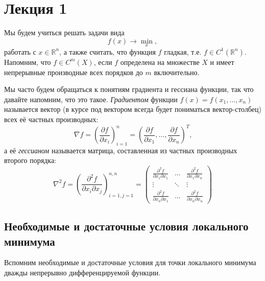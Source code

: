 \documentclass[a4paper, 12pt]{article}
\begin{document}

\section{Лекция 1}

Мы будем учиться решать задачи вида $$f(x) \rightarrow \min_{x},$$ работать с $x \in \mathbb{R}^n$, а также считать, что функция $f$ гладкая, т.е. $f \in C^1(\mathbb{R}^n)$. Напомним, что $f \in C^m(X)$, если $f$ определена на множестве $X$ и имеет непрерывные производные всех порядков до $m$ включительно.

Мы часто будем обращаться к понятиям градиента и гессиана функции, так что давайте напомним, что это такое. \textit{Градиентом} функции $f(x) = f(x_1, ..., x_n)$ называется вектор (в курсе под вектором всегда будет пониматься вектор-столбец) всех её частных производных:
$$\nabla f = \left(\frac{\partial f}{\partial x_i}\right)_{i=1}^{n} = \left(\frac{\partial f}{\partial x_1}, \dots, \frac{\partial f}{\partial x_n} \right)^T \text{,}$$
а её \textit{гессианом} называется матрица, составленная из частных производных второго порядка:
\begin{equation*} \nabla^2 f = \left(\frac{\partial^2 f}{\partial x_i \partial x_j}\right)_{i=1, j=1}^{n, n} = 
\begin{pmatrix}
  \frac{\partial^2 f}{\partial x_1 \partial x_1}& \dots & \frac{\partial^2 f}{\partial x_1 \partial x_n}\\
  \vdots & \ddots & \vdots \\
  \frac{\partial^2 f}{\partial x_n \partial x_1}& \dots & \frac{\partial^2 f}{\partial x_n \partial x_n}
\end{pmatrix}
\end{equation*}


\subsection{Необходимые и достаточные условия локального минимума}
Вспомним необходимые и достаточные условия для точки локального минимума дважды непрерывно дифференцируемой функции.
\end{document}
